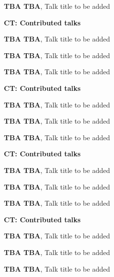 \documentclass[ILAS2025-program.tex]{subfiles}
\begin{document}
\begin{description}
\begin{description}
        \item[] \textbf{TBA TBA}, Talk title to be added
        \end{description}
    \begin{description}
    \item[] \textbf{CT: Contributed talks} 
    \item[] \textbf{TBA TBA}, Talk title to be added
        \item[] \textbf{TBA TBA}, Talk title to be added
        \item[] \textbf{TBA TBA}, Talk title to be added
        \end{description}
    \begin{description}
    \item[] \textbf{CT: Contributed talks} 
    \item[] \textbf{TBA TBA}, Talk title to be added
        \item[] \textbf{TBA TBA}, Talk title to be added
        \item[] \textbf{TBA TBA}, Talk title to be added
        \end{description}
    \begin{description}
    \item[] \textbf{CT: Contributed talks} 
    \item[] \textbf{TBA TBA}, Talk title to be added
        \item[] \textbf{TBA TBA}, Talk title to be added
        \item[] \textbf{TBA TBA}, Talk title to be added
        \end{description}
    \begin{description}
    \item[] \textbf{CT: Contributed talks} 
    \item[] \textbf{TBA TBA}, Talk title to be added
        \item[] \textbf{TBA TBA}, Talk title to be added
        \item[] \textbf{TBA TBA}, Talk title to be added
        \end{description}
    \begin{description}

\end{description}
\end{description}
\end{document}
